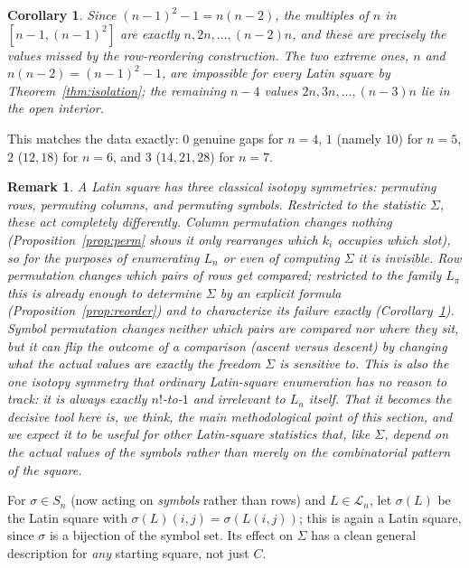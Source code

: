 \documentclass[11pt]{amsart}
\newtheorem{corollary}[theorem]{Corollary}
\newtheorem{remark}[theorem]{Remark}
\begin{document}
\begin{corollary}\label{cor:gap-exact}
Since $(n-1)^2-1=n(n-2)$, the multiples of $n$ in $[n-1,(n-1)^2]$ are exactly $n,2n,\dots,(n-2)n$, and these are precisely the values missed by the row-reordering construction. The two extreme ones, $n$ and $n(n-2)=(n-1)^2-1$, are impossible for \emph{every} Latin square by Theorem~\ref{thm:isolation}; the remaining $n-4$ values $2n,3n,\dots,(n-3)n$ lie in the open interior.
\end{corollary}

This matches the data exactly: $0$ genuine gaps for $n=4$, $1$ (namely $10$) for $n=5$, $2$ ($12,18$) for $n=6$, and $3$ ($14,21,28$) for $n=7$.

\begin{remark}
A Latin square has three classical isotopy symmetries: permuting rows, permuting columns, and permuting symbols. Restricted to the statistic $\Sigma$, these act completely differently. Column permutation changes nothing (Proposition~\ref{prop:perm} shows it only rearranges which $k_i$ occupies which slot), so for the purposes of enumerating $L_n$ or even of computing $\Sigma$ it is invisible. Row permutation changes \emph{which pairs of rows get compared}; restricted to the family $L_\pi$ this is already enough to determine $\Sigma$ by an explicit formula (Proposition~\ref{prop:reorder}) and to characterize its failure exactly (Corollary~\ref{cor:gap-exact}). Symbol permutation changes neither which pairs are compared nor where they sit, but it can flip the \emph{outcome} of a comparison (ascent versus descent) by changing what the actual values are exactly the freedom $\Sigma$ is sensitive to. This is also the one isotopy symmetry that ordinary Latin-square enumeration has no reason to track: it is always exactly $n!$-to-$1$ and irrelevant to $L_n$ itself. That it becomes the decisive tool here is, we think, the main methodological point of this section, and we expect it to be useful for other Latin-square statistics that, like $\Sigma$, depend on the actual values of the symbols rather than merely on the combinatorial pattern of the square.
\end{remark}

For $\sigma\in S_n$ (now acting on \emph{symbols} rather than rows) and $L\in\mathcal L_n$, let $\sigma(L)$ be the Latin square with $\sigma(L)(i,j)=\sigma(L(i,j))$; this is again a Latin square, since $\sigma$ is a bijection of the symbol set. Its effect on $\Sigma$ has a clean general description for \emph{any} starting square, not just $C$.
\end{document}

